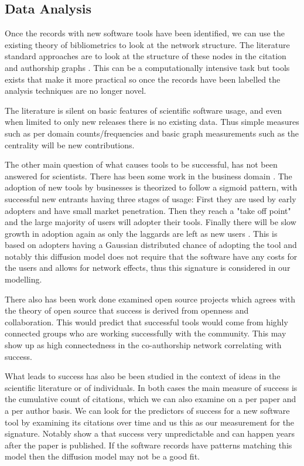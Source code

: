 \documentclass[12pt, a4paper]{article}
\begin{document}
\subsection{Data Analysis}

Once the records with new software tools have been identified, we can use the existing theory of bibliometrics to look at the network structure. The literature standard approaches are to look at the structure of these nodes in the citation and authorship graphs \citep{de2002pattern}\citep{lariviere2006canadian}\citep{borgatti2009network}. This can be a computationally intensive task but tools exists that make it more practical \citep{mclevey2017introducing} so once the records have been labelled the analysis techniques are no longer novel.

The literature is silent on basic features of scientific software usage, and even when limited to only new releases there is no existing data. Thus simple measures such as per domain counts/frequencies and basic graph measurements such as the centrality will be new contributions. 

The other main question of what causes tools to be successful, has not been answered for scientists. There has been some work in the business domain \citep{xin2008software}\citep{hsu2009computer}. The adoption of new tools by businesses is theorized to follow a sigmoid pattern, with successful new entrants having three stages of usage: First they are used by early adopters and have small market penetration. Then they reach a "take off point" and the large majority of users will adopter their tools. Finally there will be slow growth in adoption again as only the laggards are left as new users \citep{xin2008software}. This is based on adopters having a Gaussian distributed chance of adopting the tool and notably this diffusion model does not require that the software have any costs for the users and allows for network effects, thus this signature is considered in our modelling.

There also has been work done examined open source projects \citep{mockus2002two} which agrees with the theory \citep{raymond1999cathedral} of open source that success is derived from openness and collaboration. This would predict that successful tools would come from highly connected groups who are working successfully with the community. This may show up as high connectedness in the co-authorship network correlating with success.

What leads to success has also be been studied in the context of ideas in the scientific literature \citep{acharya2004ideas} \citep{johntalk} or of individuals\citep{sinatra2016quantifying}. In both cases the main measure of success is the cumulative count of citations, which we can also examine on a per paper and a per author basis. We can look for the predictors of success for a new software tool by examining its citations over time and us this as our measurement for the signature. Notably \cite{sinatra2016quantifying} show a that success very unpredictable and can happen years after the paper is published. If the software records have patterns matching this model then the diffusion model may not be a good fit.
\end{document}
